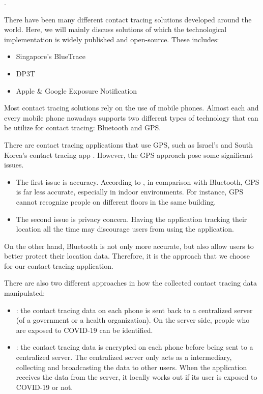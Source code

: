   \par {}.
    \par There have been many different contact tracing solutions developed around the world. Here, we will mainly discuss solutions of which the technological implementation is widely published and open-source. These includes:
      \begin{itemize}
        \item Singapore's BlueTrace
        \item DP3T
        \item Apple \& Google Exposure Notification
      \end{itemize}

    \par Most contact tracing solutions rely on the use of mobile phones. Almost each and every mobile phone nowadays supports two different types of technology that can be utilize for contact tracing: Bluetooth and GPS.
    \par There are contact tracing applications that use GPS, such as Israel's \TheShield \cite{TheShield1} and South Korea's contact tracing app \cite{Korea1}. However, the GPS approach pose some significant issues.
    \begin{itemize}
      \item The first issue is accuracy. According to \cite{BlueTrace1}, in comparison with Bluetooth, GPS is far less accurate, especially in indoor environments. For instance, GPS cannot recognize people on different floors in the same building.
      \item The second issue is privacy concern. Having the application tracking their location all the time may discourage users from using the application.
    \end{itemize}
    \par On the other hand, Bluetooth is not only more accurate, but also allow users to better protect their location data. Therefore, it is the approach that we choose for our contact tracing application.

    \par There are also two different approaches in how the collected contact tracing data manipulated:
      \begin{itemize}
        \item {}: the contact tracing data on each phone is sent back to a centralized server (of a government or a health organization). On the server side, people who are exposed to COVID-19 can be identified.
        \item {}: the contact tracing data is encrypted on each phone before being sent to a centralized server. The centralized server only acts as a intermediary, collecting and broadcasting the data to other users. When the application receives the data from the server, it locally works out if its user is exposed to COVID-19 or not.
      \end{itemize}

